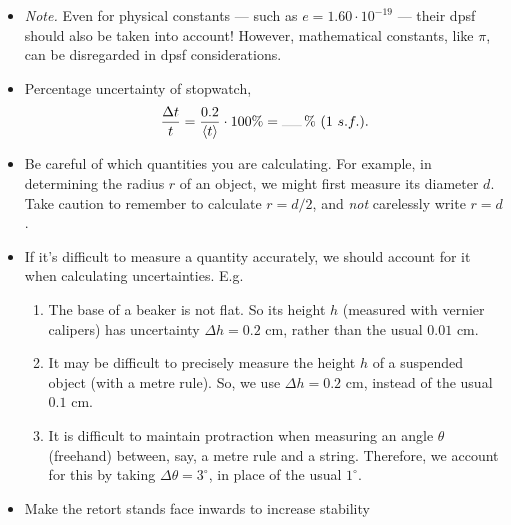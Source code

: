 \documentclass[oneside]{book}
\begin{document}
\begin{itemize}
    \item \emph{Note.} Even for physical constants --- such as \(e=1.60\cdot 10^{-19}\) --- their dpsf should also be taken into account! However, mathematical constants, like \(\pi\), can be disregarded in dpsf considerations. 
    \item Percentage uncertainty of stopwatch,
    \[\frac{\Delta t}{t}=\frac{0.2}{\langle t \rangle}\cdot 100\%=\rule{0.5cm}{0.05mm}\,\%\ (1\ s.f.).\]
    \item Be careful of which quantities you are calculating. For example, in determining the radius \(r\) of an object, we might first measure its diameter \(d\). Take caution to remember to calculate \(r=d/2\), and \emph{not} carelessly write \(r=d\).  
    \item If it's difficult to measure a quantity accurately, we should account for it when calculating uncertainties. E.g. 
    \begin{enumerate}
        \item The base of a beaker is not flat. So its height \(h\) (measured with vernier calipers) has uncertainty \(\Delta h=0.2\) cm, rather than the usual \(0.01\) cm.
        \item It may be difficult to precisely measure the height \(h\) of a suspended object (with a metre rule). So, we use \(\Delta h=0.2\) cm, instead of the usual \(0.1\) cm. 
        \item It is difficult to maintain protraction when measuring an angle \(\theta\) (freehand) between, say, a metre rule and a string. Therefore, we account for this by taking \(\Delta\theta=3^\circ\), in place of the usual \(1^\circ\).
    \end{enumerate}
    \item Make the retort stands face inwards to increase stability
\end{itemize}
\end{document}
